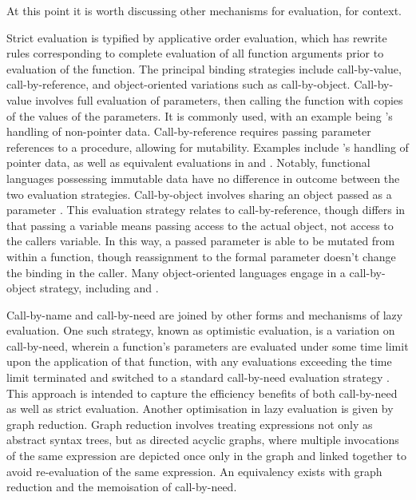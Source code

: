 At this point it is worth discussing other mechanisms for evaluation, for context.

Strict evaluation is typified by applicative order evaluation, which has rewrite rules corresponding to complete evaluation of all function arguments prior to evaluation of the function\cite{abelson1996sicp}.
The principal binding strategies include call-by-value, call-by-reference, and object-oriented variations such as call-by-object.
Call-by-value involves full evaluation of parameters, then calling the function with copies of the values of the parameters\cite{plotkin1975callnameval}.
It is commonly used, with an example being 's handling of non-pointer data.
Call-by-reference requires passing parameter references to a procedure, allowing for mutability\cite{turbak2008design}.
Examples include 's handling of pointer data, as well as equivalent evaluations in  and .
Notably, functional languages possessing immutable data have no difference in outcome between the two evaluation strategies.
Call-by-object involves sharing an object passed as a parameter \cite{liskov1979clu}.
This evaluation strategy relates to call-by-reference, though differs in that passing a variable means passing access to the actual object, not access to the callers variable.
In this way, a passed parameter is able to be mutated from within a function, though reassignment to the formal parameter doesn't change the binding in the caller.
Many object-oriented languages engage in a call-by-object strategy, including  and .

Call-by-name and call-by-need are joined by other forms and mechanisms of lazy evaluation.
One such strategy, known as optimistic evaluation, is a variation on call-by-need, wherein a function's parameters are evaluated under some time limit upon the application of that function, with any evaluations exceeding the time limit terminated and switched to a standard call-by-need evaluation strategy \cite{ennals2003optimistic}.
This approach is intended to capture the efficiency benefits of both call-by-need as well as strict evaluation.
Another optimisation in lazy evaluation is given by graph reduction.
Graph reduction involves treating expressions not only as abstract syntax trees, but as directed acyclic graphs, where multiple invocations of the same expression are depicted once only in the graph and linked together to avoid re-evaluation of the same expression\cite{hudak1989functional}.
An equivalency exists with graph reduction and the memoisation of call-by-need.

